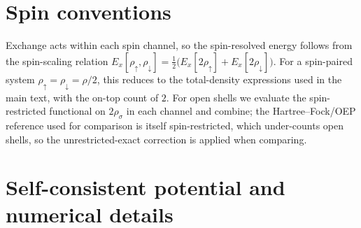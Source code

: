 \section{Spin conventions}
\label{app:spin}

Exchange acts within each spin channel, so the spin-resolved energy follows from
the spin-scaling relation
$E_x[\rho_\uparrow,\rho_\downarrow]=\tfrac12\bigl(E_x[2\rho_\uparrow]+E_x[2\rho_\downarrow]\bigr)$.
For a spin-paired system $\rho_\uparrow=\rho_\downarrow=\rho/2$, this reduces to the
total-density expressions used in the main text, with the on-top count of $2$. For
open shells we evaluate the spin-restricted functional on $2\rho_\sigma$ in each
channel and combine; the Hartree--Fock/OEP reference used for comparison is itself
spin-restricted, which under-counts open shells, so the unrestricted-exact
correction is applied when comparing.

\section{Self-consistent potential and numerical details}
\label{app:hole-numerics}

